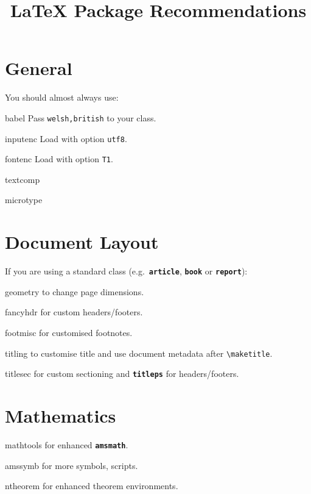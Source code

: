 \documentclass[a4paper,welsh,british,twocolumn]{article}
\title{\LaTeX{} Package Recommendations}
\begin{document}
\maketitle\thispagestyle{fancy}
\newcommand*\lpack[1]{\texttt{\bfseries #1}}
\section{General}
You should almost always use:
\begin{pkgdescription}
  \item[babel] Pass \verb|welsh,british| to your class.
  \item[inputenc] Load with option \verb|utf8|.
  \item[fontenc] Load with option \verb|T1|.
  \item[textcomp]
  \item[microtype]
\end{pkgdescription}
\section{Document Layout}
If you are using a standard class (e.g.\ \lpack{article}, \lpack{book} or \lpack{report}):
\begin{pkgdescription}
  \item[geometry] to change page dimensions.
  \item[fancyhdr] for custom headers/footers.
  \item[footmisc] for customised footnotes.
  \item[titling] to customise title and use document metadata after \verb|\maketitle|.
  \item[titlesec] for custom sectioning and \lpack{titleps} for headers/footers.
\end{pkgdescription}
\section{Mathematics}
\begin{pkgdescription}
  \item[mathtools] for enhanced \lpack{amsmath}.
  \item[amssymb] for more symbols, scripts.
  \item[ntheorem] for enhanced theorem environments.
\end{pkgdescription}
\end{document}
